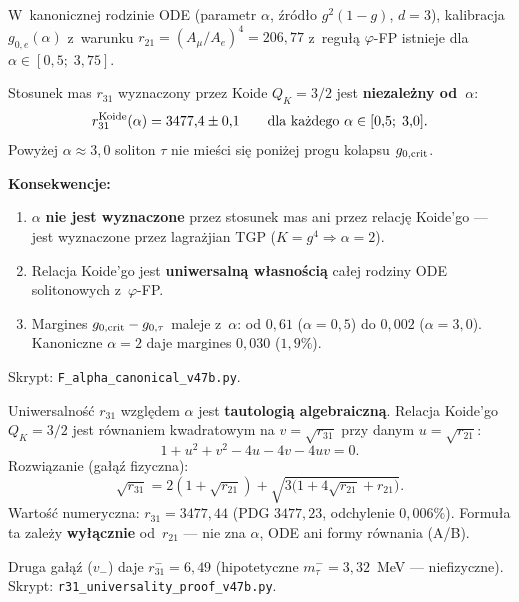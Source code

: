 \begin{proposition}%
\label{prop:T-r31-universality}
W~kanonicznej rodzinie ODE (parametr $\alpha$, \'zr\'od\l{}o $g^2(1{-}g)$,
$d = 3$), kalibracja $g_{0,e}(\alpha)$ z~warunku
$r_{21} = (A_\mu/A_e)^4 = 206{,}77$ z~regu\l{}\k{a} $\varphi$-FP
istnieje dla $\alpha \in [0{,}5;\; 3{,}75]$.

Stosunek mas $r_{31}$ wyznaczony przez Koide $Q_K = 3/2$
jest \textbf{niezale\.zny od~$\alpha$}:
\begin{equation}\label{eq:r31-universal}
  r_{31}^{\rm Koide}(\alpha) = 3477{,}4 \pm 0{,}1
  \qquad\text{dla ka\.zdego } \alpha \in [0{,}5;\; 3{,}0].
\end{equation}
Powy\.zej $\alpha \approx 3{,}0$ soliton $\tau$ nie mie\'sci si\k{e}
poni\.zej progu kolapsu $g_{0,\rm crit}$.

\medskip\noindent
\textbf{Konsekwencje:}
\begin{enumerate}[nosep]
  \item $\alpha$ \textbf{nie jest wyznaczone} przez stosunek mas
    ani przez relacj\k{e} Koide'go ---
    jest wyznaczone przez lagra\.zjian TGP ($K = g^4 \Rightarrow \alpha = 2$).
  \item Relacja Koide'go jest \textbf{uniwersaln\k{a} w\l{}asno\'sci\k{a}}
    ca\l{}ej rodziny ODE solitonowych z~$\varphi$-FP.
  \item Margines $g_{0,\rm crit} - g_{0,\tau}$ maleje z~$\alpha$:
    od $0{,}61$ ($\alpha = 0{,}5$) do $0{,}002$ ($\alpha = 3{,}0$).
    Kanoniczne $\alpha = 2$ daje margines $0{,}030$ ($1{,}9\%$).
\end{enumerate}
Skrypt: \texttt{F\_alpha\_canonical\_v47b.py}.
\end{proposition}

\begin{remark}%
\label{rem:T-r31-algebra}
Uniwersalno\'s\'c $r_{31}$ wzgl\k{e}dem $\alpha$ jest
\textbf{tautologi\k{a} algebraiczn\k{a}}.
Relacja Koide'go $Q_K = 3/2$ jest r\'ownaniem kwadratowym
na $v = \sqrt{r_{31}}$ przy danym $u = \sqrt{r_{21}}$:
\[
  1 + u^2 + v^2 - 4u - 4v - 4uv = 0.
\]
Rozwi\k{a}zanie (ga\l{}\k{a}\'z fizyczna):
\begin{equation}\label{eq:r31-formula}
  \sqrt{r_{31}} = 2(1 + \sqrt{r_{21}})
    + \sqrt{3\bigl(1 + 4\sqrt{r_{21}} + r_{21}\bigr)}.
\end{equation}
Warto\'s\'c numeryczna: $r_{31} = 3477{,}44$
(PDG $3477{,}23$, odchylenie $0{,}006\%$).
Formu\l{}a ta zale\.zy \textbf{wy\l{}\k{a}cznie} od~$r_{21}$
--- nie zna $\alpha$, ODE ani formy r\'ownania (A/B).

Druga ga\l{}\k{a}\'z ($v_-$) daje $r_{31}^- = 6{,}49$
(hipotetyczne $m_\tau^- = 3{,}32$~MeV --- niefizyczne).
Skrypt: \texttt{r31\_universality\_proof\_v47b.py}.
\end{remark}

